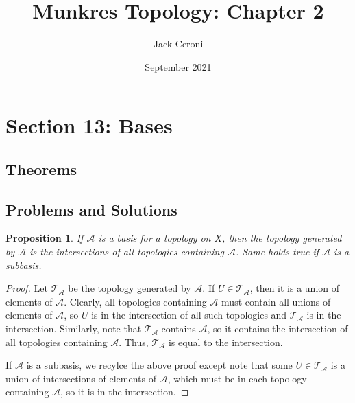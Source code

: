 \documentclass[10pt, oneside]{amsart}
\title{Munkres Topology: Chapter 2}
\author{Jack Ceroni}
\date{September 2021}
\newtheorem{prop}{Proposition}
\begin{document}
    \maketitle

    \tableofcontents

    \vspace{.25in}

    \newpage

    \section{Section 13: Bases}

    \subsection{Theorems}

    \subsection{Problems and Solutions}

    \begin{prop}
      If $\mathcal{A}$ is a basis for a topology on $X$, then the topology generated by $\mathcal{A}$ is the intersections of all topologies containing $\mathcal{A}$. Same holds true if $\mathcal{A}$ is a subbasis.
    \end{prop}

    \begin{proof}
      Let $\mathcal{T}_{\mathcal{A}}$ be the topology generated by $\mathcal{A}$. If $U \in \mathcal{T}_{\mathcal{A}}$, then it is a union of elements of $\mathcal{A}$. Clearly, all topologies containing $\mathcal{A}$ must contain
      all unions of elements of $\mathcal{A}$, so $U$ is in the intersection of all such topologies and $\mathcal{T}_{\mathcal{A}}$ is in the intersection. Similarly, note that $\mathcal{T}_{\mathcal{A}}$ contains $\mathcal{A}$, so it contains
      the intersection of all topologies containing $\mathcal{A}$. Thus, $\mathcal{T}_{\mathcal{A}}$ is equal to the intersection.
      \newline

      If $\mathcal{A}$ is a subbasis, we recylce the above proof except note that some $U \in \mathcal{T}_{\mathcal{A}}$ is a union of intersections of elements of $\mathcal{A}$, which must be in each topology containing $\mathcal{A}$, so
      it is in the intersection.
    \end{proof}
\end{document}

